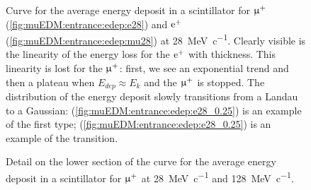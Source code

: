 \begin{refsection}
\begin{figure}
            \caption[muEDM \gf: Energy deposit in thin scintillators]{Curve for the average energy deposit in a  scintillator for $\upmu^+$ (\ref{fig:muEDM:entrance:edep:e28}) and $\text{e}^+$ (\ref{fig:muEDM:entrance:edep:mu28}) at \SI{28}{MeV\per c}. Clearly visible is the linearity of the energy loss for the $\text{e}^+$ with thickness. This linearity is lost for the $\upmu^+$: first, we see an exponential trend and then a plateau when $E_{dep}\approx E_k$ and the $\upmu^+$ is stopped. The distribution of the energy deposit slowly transitions from a Landau to a Gaussian: (\ref{fig:muEDM:entrance:edep:e28_0.25}) is an example of the first type; (\ref{fig:muEDM:entrance:edep:e28_0.25}) is an example of the transition.}
            \label{fig:muEDM:entrance:edep}
        \end{figure}
        
        \begin{figure}   
            \centering
            \hfill
            \caption[muEDM \gf: Energy deposit in thin scintillators (log-scale)]{Detail on the lower section of the curve for the average energy deposit in a  scintillator for $\upmu^+$ at \SI{28}{MeV\per c} and \SI{128}{MeV\per c}.}
            \label{fig:muEDM:entrance:edep:log}
        \end{figure}


\end{refsection}
